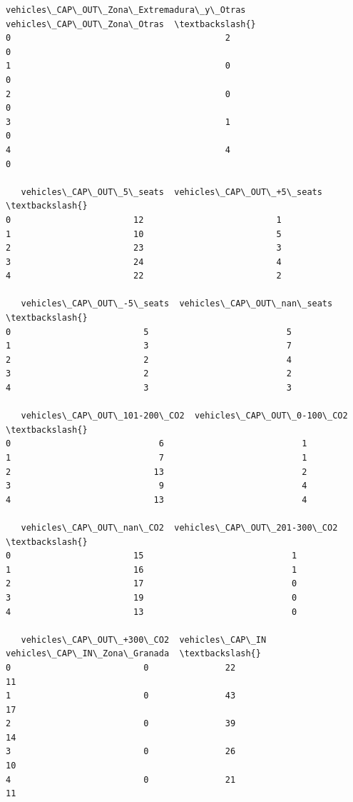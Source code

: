 \documentclass[11pt]{article}
\begin{document}
\begin{tcolorbox}[breakable, size=fbox, boxrule=.5pt, pad at break*=1mm, opacityfill=0]
\begin{Verbatim}[commandchars=\\\{\}]
   vehicles\_CAP\_OUT\_Zona\_Extremadura\_y\_Otras  vehicles\_CAP\_OUT\_Zona\_Otras  \textbackslash{}
0                                          2                            0
1                                          0                            0
2                                          0                            0
3                                          1                            0
4                                          4                            0

   vehicles\_CAP\_OUT\_5\_seats  vehicles\_CAP\_OUT\_+5\_seats  \textbackslash{}
0                        12                          1
1                        10                          5
2                        23                          3
3                        24                          4
4                        22                          2

   vehicles\_CAP\_OUT\_-5\_seats  vehicles\_CAP\_OUT\_nan\_seats  \textbackslash{}
0                          5                           5
1                          3                           7
2                          2                           4
3                          2                           2
4                          3                           3

   vehicles\_CAP\_OUT\_101-200\_CO2  vehicles\_CAP\_OUT\_0-100\_CO2  \textbackslash{}
0                             6                           1
1                             7                           1
2                            13                           2
3                             9                           4
4                            13                           4

   vehicles\_CAP\_OUT\_nan\_CO2  vehicles\_CAP\_OUT\_201-300\_CO2  \textbackslash{}
0                        15                             1
1                        16                             1
2                        17                             0
3                        19                             0
4                        13                             0

   vehicles\_CAP\_OUT\_+300\_CO2  vehicles\_CAP\_IN  vehicles\_CAP\_IN\_Zona\_Granada  \textbackslash{}
0                          0               22                            11
1                          0               43                            17
2                          0               39                            14
3                          0               26                            10
4                          0               21                            11


\end{Verbatim}
\end{tcolorbox}
\end{document}
